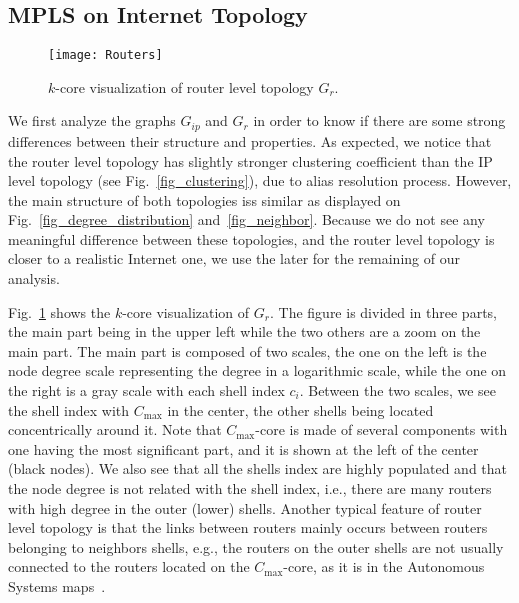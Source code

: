 \subsection{MPLS on Internet Topology}\label{cluster.topo}
\begin{figure}[!t]
  \begin{center}
    \texttt{[image: Routers]}
  \end{center}
  \caption{$k$-core visualization of router level topology $G_{r}$.}
  \label{fig_k_core_routers}
\end{figure}

We first analyze the graphs $G_{ip}$ and $G_{r}$ in order to know if there are
some strong differences between their structure and properties. As expected, we
notice that the router level topology has slightly stronger clustering
coefficient than the IP level topology (see Fig.~\ref{fig_clustering}), due to
alias resolution process.  However, the main structure of both topologies iss
similar as displayed on Fig.~\ref{fig_degree_distribution}
and~\ref{fig_neighbor}. Because we do not see any meaningful difference
between these topologies, and the router level topology is closer to a
realistic Internet one, we use the later for the remaining of our analysis.

Fig.~\ref{fig_k_core_routers} shows the $k$-core visualization of $G_{r}$.  The
figure is divided in three parts, the main part being in the upper left while
the two others are a zoom on the main part.  The main part is composed of two
scales, the one on the left is the node degree scale representing the degree in
a logarithmic scale, while the one on the right is a gray scale with each shell
index $c_i$.  Between the two scales, we see the shell index with $C_{\max}$ in
the center, the other shells being located concentrically around it. Note that
$C_{\max}$-core is made of several components with one having the most
significant part, and it is shown at the left of the center (black nodes).  We
also see that all the shells index are highly populated and that the node degree
is not related with the shell index, i.e., there are many routers with high
degree in the outer (lower) shells.  Another typical feature of router level
topology is that the links between routers mainly occurs between routers
belonging to neighbors shells, e.g., the routers on the outer shells are not
usually connected to the routers located on the  $C_{\max}$-core, as it is in
the Autonomous Systems maps~\cite{Alvarez06k}.

